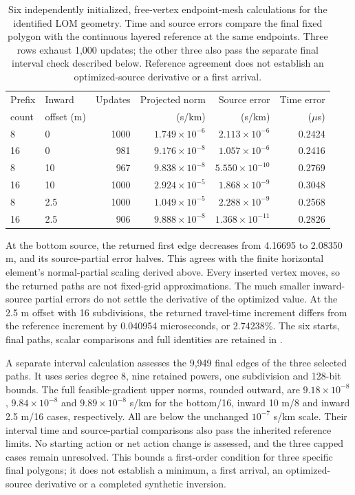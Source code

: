 \begin{table}[ht]
\centering
\small
\begin{tabular}{llrrrr}
\toprule
Prefix & Inward & Updates & Projected norm & Source error & Time error \\
count & offset (m) & & (s/km) & (s/km) & ($\mu$s) \\
\midrule
8  & 0   & 1000 & $1.749\times10^{-6}$ & $2.113\times10^{-6}$ & 0.2424 \\
16 & 0   & 981  & $9.176\times10^{-8}$ & $1.057\times10^{-6}$ & 0.2416 \\
8  & 10  & 967  & $9.838\times10^{-8}$ & $5.550\times10^{-10}$ & 0.2769 \\
16 & 10  & 1000 & $2.924\times10^{-5}$ & $1.868\times10^{-9}$ & 0.3048 \\
8  & 2.5 & 1000 & $1.049\times10^{-5}$ & $2.288\times10^{-9}$ & 0.2568 \\
16 & 2.5 & 906  & $9.888\times10^{-8}$ & $1.368\times10^{-11}$ & 0.2826 \\
\bottomrule
\end{tabular}
\caption{Six independently initialized, free-vertex endpoint-mesh calculations
for the identified LOM geometry. Time and source errors compare the final
fixed polygon with the continuous layered reference at the same endpoints.
Three rows exhaust 1,000 updates; the other three also pass the separate
final interval check described below. Reference agreement does not establish an
optimized-source derivative or a first arrival.}
\label{tab:endpoint-mesh}
\end{table}

At the bottom source, the returned first edge decreases from 4.16695 to
2.08350 m, and its source-partial error halves. This agrees with the finite
horizontal element's normal-partial scaling derived above. Every inserted
vertex moves, so the returned paths are not fixed-grid approximations.
The much smaller inward-source partial errors do not settle the derivative
of the optimized value. At the 2.5 m offset with 16 subdivisions, the returned
travel-time increment differs from the reference increment by
0.040954 microseconds, or 2.74238\%. The six starts, final paths, scalar
comparisons and full identities are retained in
.

A separate interval calculation assesses the 9,949 final edges of the three
selected paths. It uses series degree 8, nine retained powers, one subdivision
and 128-bit bounds. The full feasible-gradient upper norms, rounded outward,
are $9.18\times10^{-8}$, $9.84\times10^{-8}$ and $9.89\times10^{-8}$ s/km
for the bottom/16, inward 10 m/8 and inward 2.5 m/16 cases, respectively.
All are below the unchanged $10^{-7}$ s/km scale. Their interval time and
source-partial comparisons also pass the inherited reference limits. No
starting action or net action change is assessed, and the three capped
cases remain unresolved. This bounds a first-order condition for three
specific final polygons; it does not establish a minimum, a first arrival,
an optimized-source derivative or a completed synthetic inversion.

